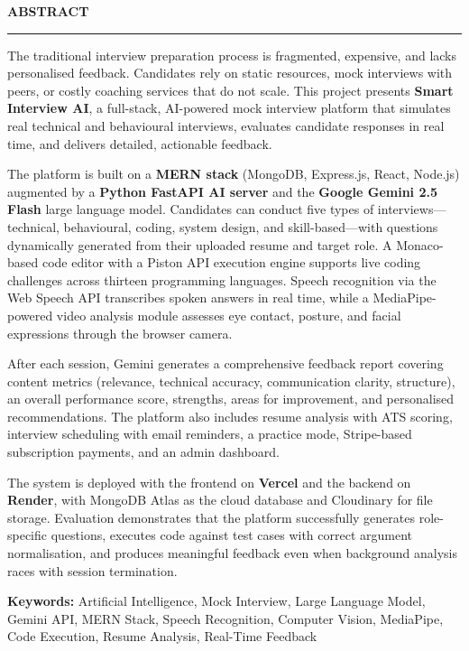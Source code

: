 \thispagestyle{empty}

\begin{center}
{\Large {\bf \uppercase{Abstract}}}
\end{center}

\vspace{\baselineskip}
\hrule
\vspace{2\baselineskip}

\noindent
The traditional interview preparation process is fragmented, expensive, and lacks personalised feedback. Candidates rely on static resources, mock interviews with peers, or costly coaching services that do not scale. This project presents \textbf{Smart Interview AI}, a full-stack, AI-powered mock interview platform that simulates real technical and behavioural interviews, evaluates candidate responses in real time, and delivers detailed, actionable feedback.

The platform is built on a \textbf{MERN stack} (MongoDB, Express.js, React, Node.js) augmented by a \textbf{Python FastAPI AI server} and the \textbf{Google Gemini 2.5 Flash} large language model. Candidates can conduct five types of interviews---technical, behavioural, coding, system design, and skill-based---with questions dynamically generated from their uploaded resume and target role. A Monaco-based code editor with a Piston API execution engine supports live coding challenges across thirteen programming languages. Speech recognition via the Web Speech API transcribes spoken answers in real time, while a MediaPipe-powered video analysis module assesses eye contact, posture, and facial expressions through the browser camera.

After each session, Gemini generates a comprehensive feedback report covering content metrics (relevance, technical accuracy, communication clarity, structure), an overall performance score, strengths, areas for improvement, and personalised recommendations. The platform also includes resume analysis with ATS scoring, interview scheduling with email reminders, a practice mode, Stripe-based subscription payments, and an admin dashboard.

The system is deployed with the frontend on \textbf{Vercel} and the backend on \textbf{Render}, with MongoDB Atlas as the cloud database and Cloudinary for file storage. Evaluation demonstrates that the platform successfully generates role-specific questions, executes code against test cases with correct argument normalisation, and produces meaningful feedback even when background analysis races with session termination.

\vspace{\baselineskip}
\noindent
{\large \bf{Keywords:} } Artificial Intelligence, Mock Interview, Large Language Model, Gemini API, MERN Stack, Speech Recognition, Computer Vision, MediaPipe, Code Execution, Resume Analysis, Real-Time Feedback
